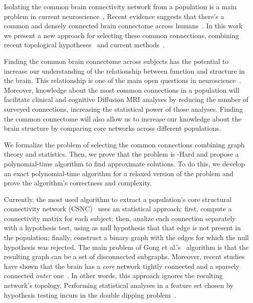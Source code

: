 
Isolating the common brain connectivity network from a population is a main problem in current neuroscience~\cite{Bullmore2009,Gong2009,Wassermann2016}. Recent evidence suggests that there's a common and densely connected brain connectome across humans~\cite{Bassett2013}. In this work we present a new approach for selecting these common connections, combining recent topological hypotheses~\cite{Bassett2013}  and  current methods~\cite{Gong2009,Wassermann2016}.

Finding the common brain connectome across subjects has the potential to increase our understanding of the relationship between function and structure in the brain. This relationship is one of the main open questions in neuroscience~\cite{Bullmore2009,Donahue2016}. Moreover, knowledge about the most common connections in a population will facilitate clinical and cognitive Diffusion MRI analyses by reducing the number of surveyed connections, increasing the statistical power of those analyses. Finding the common connectome will also allow us to increase our knowledge about the brain structure by comparing core networks across different populations.

We formalize the problem of selecting the common connections combining graph theory and statistics. Then, we prove that the problem is \NP-Hard and propose a polynomial-time algorithm to find approximate solutions. To do this, we develop an exact polynomial-time algorithm for a relaxed version of the problem and prove the algorithm's correctness and complexity.

Currently, the most used algorithm to extract a population's core structural connectivity network (CSNC)~\cite{Gong2009} uses an statistical approach: first, compute a connectivity matrix for each subject; then, analize each connection separately with a hypothesis test, using as null hypothesis that that edge is not present in the population; finally, construct a binary graph with the edges for which the null hypothesis was rejected. The main problem of Gong et al.'s~\cite{Gong2009} algorithm is that the resulting graph can be a set of disconnected subgraphs. Moreover, recent studies have shown that the brain has a \emph{core} network tightly connected and a sparsely connected \emph{outer} one~\cite{Bassett2013}. In other words, this approach ignores the resulting network's topology. Performing statistical analyses in a feature set chosen by hypothesis testing incurs in the double dipping problem~\cite{Kriegeskorte2009}.

